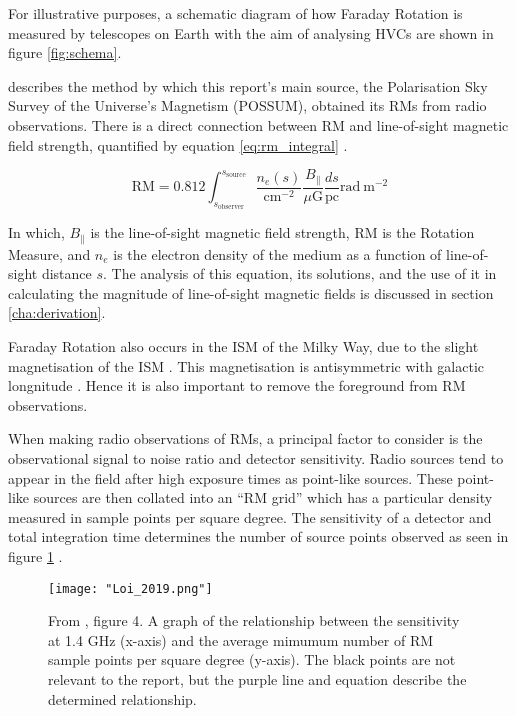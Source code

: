 For illustrative purposes, a schematic diagram of how Faraday Rotation is measured by telescopes on Earth with the aim of analysing HVCs are shown in figure \ref{fig:schema}.


\cite{ID1} describes the method by which this report's main source, the Polarisation Sky Survey of the Universe's Magnetism (POSSUM), obtained its RMs from radio observations. There is a direct connection between RM and line-of-sight magnetic field strength, quantified by equation \ref{eq:rm_integral} \citep{ID5, ID1, ID26, ID27, ID30}.


\begin{equation}
    \mathrm{RM} = 0.812 \int_{s_{\mathrm{observer}}}^{s_{\mathrm{source}}}{\frac{n_e(s)}{\mathrm{cm^{-2}}}\frac{B_{\parallel}}{\mu\mathrm{G}}\frac{ds}{\mathrm{pc}}} \mathrm{rad~m^{-2}}
    \label{eq:rm_integral}
\end{equation}


In which, $B_{\parallel}$ is the line-of-sight magnetic field strength, $\mathrm{RM}$ is the Rotation Measure, and $n_e$ is the electron density of the medium as a function of line-of-sight distance $s$. The analysis of this equation, its solutions, and the use of it in calculating the magnitude of line-of-sight magnetic fields is discussed in section \ref{cha:derivation}.


Faraday Rotation also occurs in the ISM of the Milky Way, due to the slight magnetisation of the ISM \citep{ID37, ID30, ID21}. This magnetisation is antisymmetric with galactic longnitude \citep{ID30}. Hence it is also important to remove the foreground from RM observations.


When making radio observations of RMs, a principal factor to consider is the observational signal to noise ratio and detector sensitivity. Radio sources tend to appear in the field after high exposure times as point-like sources. These point-like sources are then collated into an “RM grid” which has a particular density measured in sample points per square degree. The sensitivity of a detector and total integration time determines the number of source points observed as seen in figure \ref{fig:loi} \citep{ID59}.

\begin{figure}
    \texttt{[image: "Loi\_2019.png"]}
    \centering
    \caption{From \cite{ID59}, figure 4. A graph of the relationship between the sensitivity at 1.4 GHz (x-axis) and the average mimumum number of RM sample points per square degree (y-axis). The black points are not relevant to the report, but the purple line and equation describe the determined relationship.}
    \label{fig:loi}
\end{figure}

